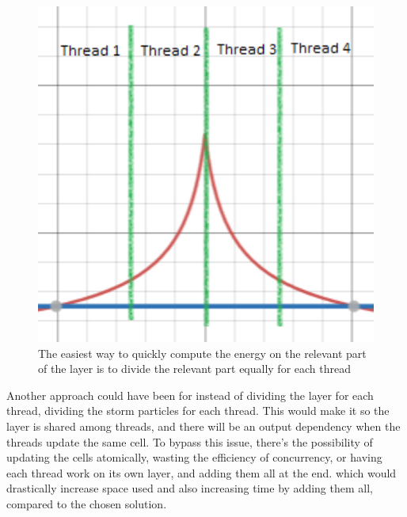 \begin{figure}[h]
    \centering
    \includegraphics[scale=0.4]{images/Thread_separation.png}
    \caption{The easiest way to quickly compute the energy on the relevant part of the layer is to divide the relevant part equally for each thread}
    \label{fig:my_label}
\end{figure}

Another approach could have been for instead of dividing the layer for each thread, dividing the storm particles for each thread. This would make it so the layer is shared among threads, and there will be an output dependency when the threads update the same cell. To bypass this issue, there's the possibility of updating the cells atomically, wasting the efficiency of concurrency, or having each thread work on its own layer, and adding them all at the end. which would drastically increase space used and also increasing time by adding them all, compared to the chosen solution.



